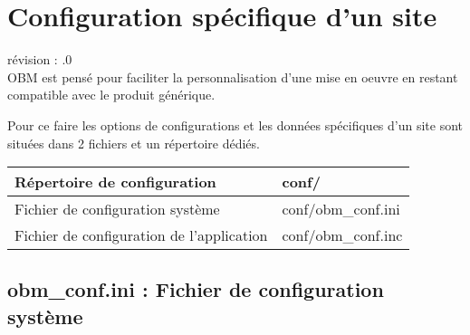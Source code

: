 
\section{Configuration spécifique d'un site}

révision : .0\\

OBM est pensé pour faciliter la personnalisation d'une mise en oeuvre en restant compatible avec le produit générique.

Pour ce faire les options de configurations et les données spécifiques d'un site sont situées dans 2 fichiers et un répertoire dédiés.\\

\begin{tabular}{|p{7cm}|p{5cm}|}
\hline
Répertoire de configuration & conf/ \\
\hline
Fichier de configuration système & conf/obm\_conf.ini \\
\hline
Fichier de configuration de l'application & conf/obm\_conf.inc \\
\hline
\end{tabular}


\subsection{obm\_conf.ini : Fichier de configuration système}


